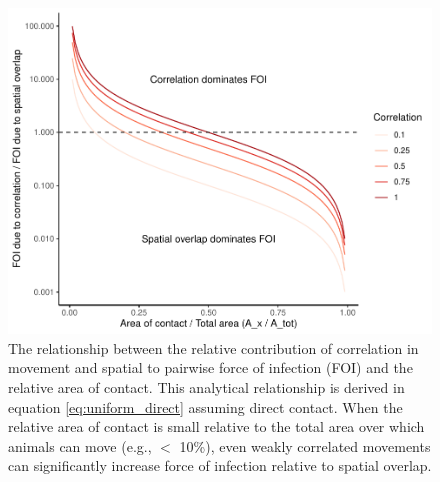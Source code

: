 \documentclass[letterpaper]{article}
\begin{document}
\begin{figure}
    \includegraphics[width=\textwidth]{figures/correlation_analytical_figure.pdf}
    \caption{The relationship between the relative contribution of correlation in movement and spatial to pairwise force of infection (FOI) and the relative area of contact. This analytical relationship is derived in equation \ref{eq:uniform_direct} assuming direct contact.  When the relative area of contact is small relative to the total area over which animals can move (e.g., $<$ 10\%), even weakly correlated movements can significantly increase force of infection relative to spatial overlap.}
    \label{fig:analytical_corr}
\end{figure}
\end{document}
